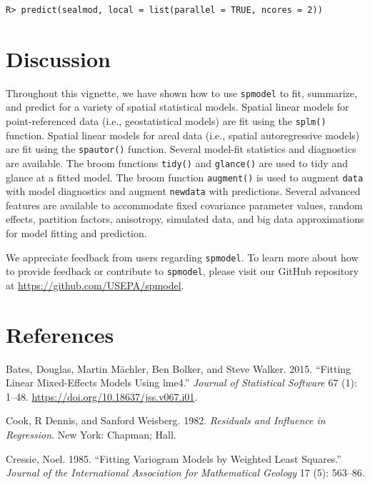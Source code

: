 \documentclass{article}
\begin{document}
\begin{verbatim}
R> predict(sealmod, local = list(parallel = TRUE, ncores = 2))
\end{verbatim}

\hypertarget{sec:discussion}{%
\section{Discussion}\label{sec:discussion}}

Throughout this vignette, we have shown how to use \texttt{spmodel} to
fit, summarize, and predict for a variety of spatial statistical models.
Spatial linear models for point-referenced data (i.e., geostatistical
models) are fit using the \texttt{splm()} function. Spatial linear
models for areal data (i.e., spatial autoregressive models) are fit
using the \texttt{spautor()} function. Several model-fit statistics and
diagnostics are available. The broom functions \texttt{tidy()} and
\texttt{glance()} are used to tidy and glance at a fitted model. The
broom function \texttt{augment()} is used to augment \texttt{data} with
model diagnostics and augment \texttt{newdata} with predictions. Several
advanced features are available to accommodate fixed covariance
parameter values, random effects, partition factors, anisotropy,
simulated data, and big data approximations for model fitting and
prediction.

We appreciate feedback from users regarding \texttt{spmodel}. To learn
more about how to provide feedback or contribute to \texttt{spmodel},
please visit our GitHub repository at
\url{https://github.com/USEPA/spmodel}.

\hypertarget{references}{%
\section*{References}\label{references}}

\hypertarget{refs}{}
\leavevmode\hypertarget{ref-bates2015lme4}{}%
Bates, Douglas, Martin Mächler, Ben Bolker, and Steve Walker. 2015.
``Fitting Linear Mixed-Effects Models Using lme4.'' \emph{Journal of
Statistical Software} 67 (1): 1--48.
\url{https://doi.org/10.18637/jss.v067.i01}.

\leavevmode\hypertarget{ref-cook1982residuals}{}%
Cook, R Dennis, and Sanford Weisberg. 1982. \emph{Residuals and
Influence in Regression}. New York: Chapman; Hall.

\leavevmode\hypertarget{ref-cressie1985fitting}{}%
Cressie, Noel. 1985. ``Fitting Variogram Models by Weighted Least
Squares.'' \emph{Journal of the International Association for
Mathematical Geology} 17 (5): 563--86.
\end{document}
